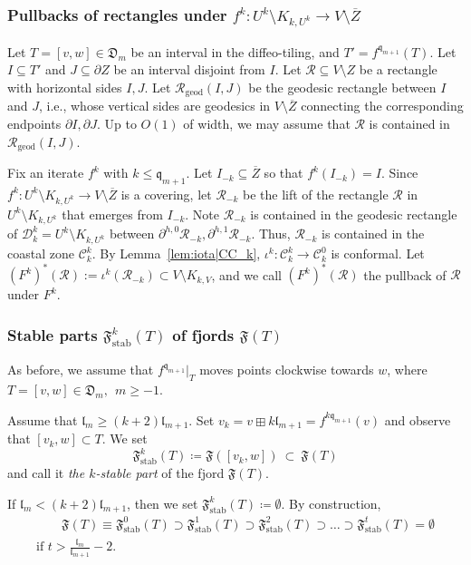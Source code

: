\documentclass{amsart}
\renewcommand{\sp}{{\ \ }}
\newcommand{\1}{{\mathbb 1 }}
\newcommand{\stab}{{\text{stab}}}
\newcommand\RR{\mathcal{R}}
\newcommand{\qq}{\mathfrak{q}}
\newcommand{\length}{{\mathfrak l}}
\newcommand\DD{\mathcal{D}}
\newcommand{\Dbb}{{\mathfrak{D}}}
\theoremstyle{remark}
\numberwithin{equation}{section}
\theoremstyle{definition}
\newcommand{\CC}{{\mathcal C}}
\begin{document}
\subsubsection{Pullbacks of rectangles under $f^k: U^k\setminus K_{k, U^k} \longrightarrow V\setminus \overline{Z}$}\label{sss:pullbackrect}
Let $T = [v, w]\in \Dbb_m$ be an interval in the diffeo-tiling, and $T' = f^{\qq_{m+1}}(T)$.
Let $I \subseteq T'$ and $J \subseteq \partial Z$ be an interval disjoint from $I$.
Let $\RR \subseteq V\setminus Z$ be a rectangle with horizontal sides $I, J$.
Let $\RR_{\text{geod}}(I,J)$ be the geodesic rectangle between $I$ and $J$, i.e., whose vertical sides are geodesics in $V \setminus \overline{Z}$ connecting the corresponding endpoints $\partial I, \partial J$.
Up to $O(1)$ of width, we may assume that $\RR$ is contained in $\RR_{\text{geod}}(I,J)$.


Fix an iterate $f^k$ with $k \leq \qq_{m+1}$.
Let $I_{-k} \subseteq \overline{Z}$ so that $f^k(I_{-k}) = I$.
Since $f^k: U^k\setminus K_{k, U^k} \longrightarrow V\setminus \overline{Z}$ is a covering, let $\RR_{-k}$ be the lift of the rectangle $\RR$ in $U^k\setminus K_{k, U^k}$ that emerges from $I_{-k}$.
Note $\RR_{-k}$ is contained in the geodesic rectangle of $\DD^k_k = U^k\setminus K_{k, U^k}$ between $\partial^{h,0}\RR_{-k}, \partial^{h,1}\RR_{-k}$.
Thus, $\RR_{-k}$ is contained in the coastal zone $\CC^k_k$.
By Lemma~\ref{lem:iota|CC_k}, $\iota^k:\CC^k_k \longrightarrow \CC^0_k$ is conformal.
Let $(F^k)^*(\RR) :=\iota^k(\RR_{-k}) \subset V\setminus K_{k,V}$, and we call $(F^k)^*(\RR)$ the pullback of $\RR$ under $F^k$.


\subsubsection{Stable parts $\mathfrak F^k_\stab(T)$ of fjords $\mathfrak F(T)$} \label{sss:F:stab} As before, we assume that $f^{\qq_{m+1}}|_T$ moves points clockwise towards $w$, where $T=[v,w]\in \Dbb_m, \sp m\ge -1$. 


Assume that $\length_{m}\ge (k+2)\length_{m+1}$. Set $v_k=v\boxplus k\length_{m+1}=f^{k\qq_{m+1}}(v)$ and observe that $[v_k,w]\subset T$. We set 
\[ \mathfrak F_{\stab}^k(T)\coloneqq  \mathfrak F([v_k,w]) \ \subset \ \mathfrak F(T)\]
and call it \emph{the $k$-stable part} of the fjord $\mathfrak F(T)$. 



If $\length_{m}< (k+2)\length_{m+1}$, then we set $\mathfrak F_{\stab}^k(T) \coloneqq \emptyset$. By construction,
\begin{multline*}\qquad \mathfrak F(T) \equiv\mathfrak F_{\stab}^0(T)\supset \mathfrak F_{\stab}^1(T)\supset \mathfrak F_{\stab}^2(T)\supset \dots \supset \mathfrak F_{\stab}^t(T)=\emptyset \\ \text{if }t> \frac{\length_m}{\length_{m+1}}-2. \quad
\end{multline*}
\end{document}
